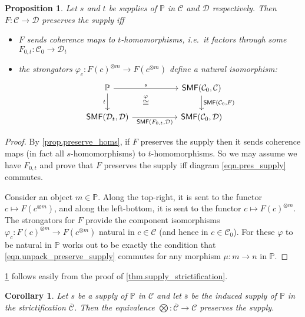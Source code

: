 \documentclass[11pt, oneside, article]{memoir}
\theoremstyle{plain}
\newtheorem{proposition}[theorem]{Proposition}
\newtheorem{corollary}[theorem]{Corollary}
\theoremstyle{definition}
\theoremstyle{remark}
\newcommand{\cat}[1]{\mathcal{#1}}%
\newcommand{\Cat}[1]{{\mathsf{#1}}}%
\newcommand{\tpow}[1]{^{\otimes #1}}
\newcommand{\strict}[1]{\overline{#1}}
\newcommand{\smf}{\Cat{SMF}}
\newcommand{\pp}{\mathbb{P}}
\begin{document}
\begin{proposition}\label{prop.easy_pres_supply}
Let $s$ and $t$ be supplies of $\pp$ in $\cat{C}$ and $\cat{D}$ respectively. Then $F\colon\cat{C}\to\cat{D}$ preserves the supply iff
\begin{itemize}
	\item $F$ sends coherence maps to $t$-homomorphisms, i.e.\ it factors through some $F_{0,t}\colon\cat{C}_0\to\cat{D}_t$
	\item the strongators $\varphi_c\colon F(c)\tpow{m}\to F(c\tpow{m})$ define a natural isomorphism:
\begin{equation}\label{eqn.pres_supply}
\begin{tikzcd}[column sep=55pt]
	\pp\ar[r, "s"]\ar[d, "t"']&
	\smf(\cat{C}_0,\cat{C})\ar[d, "{\smf(\cat{C}_0,F)}"]\\
	\smf(\cat{D}_t,\cat{D})\ar[r, "{\smf(F_{0,t},\cat{D})}"']&
	\smf(\cat{C}_0,\cat{D})\ar[ul, phantom, "\overset{\varphi}{\cong}"]
\end{tikzcd}
\end{equation}
\end{itemize}
\end{proposition}
\begin{proof}
By \cref{prop.preserve_homs}, if $F$ preserves the supply then it sends coherence maps (in fact all $s$-homomorphisms) to $t$-homomorphisms. So we may assume we have $F_{0,t}$ and prove that $F$ preserves the supply iff diagram \eqref{eqn.pres_supply} commutes.

Consider an object $m\in\pp$. Along the top-right, it is sent to the functor $c\mapsto F(c\tpow{m})$, and along the left-bottom, it is sent to the functor $c\mapsto F(c)\tpow{m}$. The strongators for $F$ provide the component isomorphisms $\varphi_c\colon F(c)\tpow{m}\to F(c\tpow{m})$ natural in $c\in\cat{C}$ (and hence in $c\in\cat{C}_0$). For these $\varphi$ to be natural in $\pp$ works out to be exactly the condition that  \cref{eqn.unpack_preserve_supply} commutes for any morphism $\mu\colon m\to n$ in $\pp$.
\end{proof}

\cref{cor.strict_equiv_pres_supply} follows easily from the proof of \cref{thm.supply_strictification}.

\begin{corollary}\label{cor.strict_equiv_pres_supply}
Let $s$ be a supply of $\pp$ in $\cat{C}$ and let $\strict{s}$ be the induced supply of $\pp$ in the strictification $\strict{\cat{C}}$. Then the equivalence $\bigotimes\colon\strict{\cat{C}}\to\cat{C}$ preserves the supply.
\end{corollary}
\end{document}
